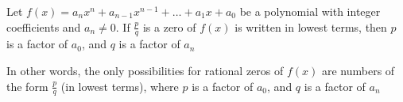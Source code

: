 
\begin{theorem}
  \label{thrm:rational_zero_theorem}

  Let $f(x) = a_{n} x^{n} + a_{n - 1} x^{n - 1} + \ldots + a_1 x + a_0$ be a
  polynomial with integer coefficients and $a_{n} \ne 0$. If $\frac{p}{q}$ is a
  zero of $f(x)$ is written in lowest terms, then $p$ is a factor of $a_0$, and
  $q$ is a factor of $a_n$ 

  In other words, the only possibilities for rational zeros of $f(x)$ are
  numbers of the form $\frac{p}{q}$ (in lowest terms), where $p$ is a factor of
  $a_0$, and $q$ is a factor of $a_n$
\end{theorem}

